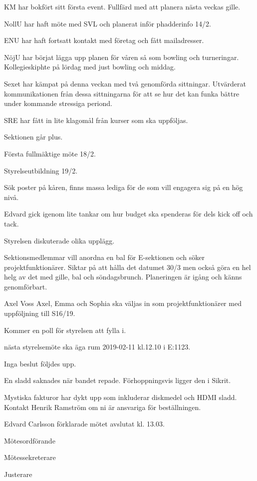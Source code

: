 \documentclass[10pt]{article}
\def\mo{Edvard Carlsson}
\def\ms{Sonja Kenari}
\def\ji{Theo Nyman}
\begin{document}
\begin{paragrafer}
\begin{paragrafer}
KM har bokfört sitt första event. Fullfärd med att planera nästa veckas gille.

NollU har haft möte med SVL och planerat inför phadderinfo 14/2.

ENU har haft fortsatt kontakt med företag och fått mailadresser.

NöjU har börjat lägga upp planen för våren så som bowling och turneringar. Kollegieskiphte på lördag med just bowling och middag.

Sexet har kämpat på denna veckan med två genomförda sittningar. Utvärderat kommunikationen från dessa sittningarna för att se hur det kan funka bättre under kommande stressiga periond.

SRE har fått in lite klagomål från kurser som ska uppföljas.



Sektionen går plus.

Första fullmäktige möte 18/2.

Styrelseutbildning 19/2. 

Sök poster på kåren, finns massa lediga för de som vill engagera sig på en hög nivå.

\end{paragrafer}

Edvard gick igenom lite tankar om hur budget ska spenderas för dels kick off och tack.

Styrelsen diskuterade olika upplägg. 

Sektionsmedlemmar vill anordna en bal för E-sektionen och söker projektfunktionärer. Siktar på att hålla det datumet 30/3 men också göra en hel helg av det med gille, bal och söndagsbrunch. Planeringen är igång och känns genomförbart.

Axel Voss \ypa Axel, Emma och Sophia ska väljas in som projektfunktionärer med uppföljning till S16/19.

\Mbaby

Kommer en poll för styrelsen att fylla i.


\Mba nästa styrelsemöte ska äga rum 2019-02-11 kl.12.10 i E:1123.

Inga beslut följdes upp.

En sladd saknades när bandet repade. Förhoppningsvis ligger den i Sikrit.

Mystiska fakturor har dykt upp som inkluderar diskmedel och HDMI sladd. Kontakt Henrik Ramström om ni är ansvariga för beställningen.

{\mo} förklarade mötet avslutat kl. 13.03. 
\end{paragrafer}

\hidesignfoot
\begin{signatures}{3}
\signature{\mo}{Mötesordförande}
\signature{\ms}{Mötessekreterare}
\signature{\ji}{Justerare}
\end{signatures}
\end{document}
